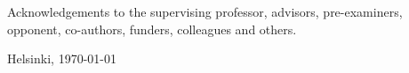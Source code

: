 
Acknowledgements to the supervising professor, advisors, pre-examiners,
opponent, co-authors, funders, colleagues and others.

\bigskip
\noindent Helsinki, \today\par
\bigskip
\noindent \ThesisAuthor
